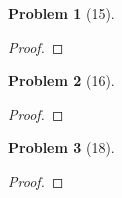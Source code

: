 \documentclass[10pt]{article}
\newcommand{\sk}{\vskip 10mm}
\theoremstyle{plain}
\newtheorem{problem}{Problem}
\theoremstyle{remark}
\begin{document}
\begin{problem}[15]
  
\end{problem}

\begin{proof}
  
\end{proof}

\sk

\begin{problem}[16]
  
\end{problem}

\begin{proof}
  
\end{proof}

\sk

\begin{problem}[18]
  
\end{problem}

\begin{proof}
  
\end{proof}

\end{document}
